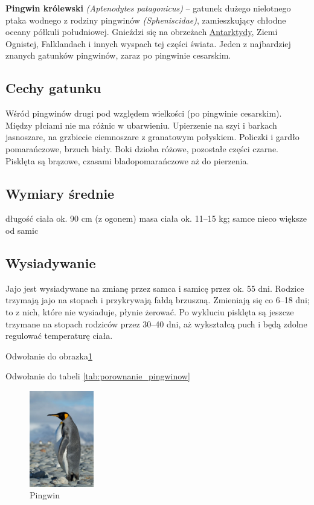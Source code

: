 \noindent \textbf{Pingwin królewski} \textit{(Aptenodytes patagonicus)} – gatunek dużego nielotnego ptaka wodnego z rodziny pingwinów \textit{(Spheniscidae)}, zamieszkujący chłodne oceany półkuli południowej. Gnieździ się na obrzeżach \underline{Antarktydy}, Ziemi Ognistej, Falklandach i innych wyspach tej części świata. Jeden z najbardziej znanych gatunków pingwinów, zaraz po pingwinie cesarskim.
\subsection*{Cechy gatunku}
Wśród pingwinów drugi pod względem wielkości (po pingwinie cesarskim). Między płciami nie ma różnic w ubarwieniu. Upierzenie na szyi i barkach jasnoszare, na grzbiecie ciemnoszare z granatowym połyskiem. Policzki i gardło pomarańczowe, brzuch biały. Boki dzioba różowe, pozostałe części czarne. Pisklęta są brązowe, czasami bladopomarańczowe aż do pierzenia.
\subsection*{Wymiary średnie}
długość ciała ok. 90 cm (z ogonem)
masa ciała ok. 11–15 kg; samce nieco większe od samic
\subsection*{Wysiadywanie}
Jajo jest wysiadywane na zmianę przez samca i samicę przez ok. 55 dni. Rodzice trzymają jajo na stopach i przykrywają fałdą brzuszną. Zmieniają się co 6–18 dni; to z nich, które nie wysiaduje, płynie żerować. Po wykluciu pisklęta są jeszcze trzymane na stopach rodziców przez 30–40 dni, aż wykształcą puch i będą zdolne regulować temperaturę ciała.

\noindent Odwołanie do obrazka\ref{fig:pingwin}

\noindent Odwołanie do tabeli \ref{tab:porownanie_pingwinow}


\begin{figure}[htbp]
    \centering
    \includegraphics[width=0.25\textwidth]{pictures/pingwin.jpg}
    \caption{Pingwin}
    \label{fig:pingwin}
\end{figure}
